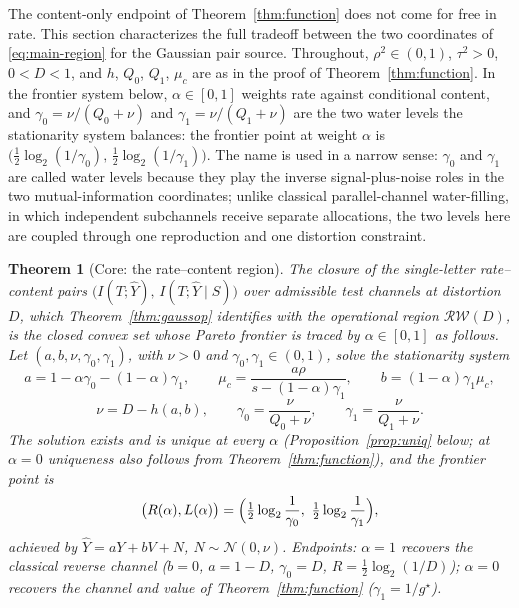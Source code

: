 ﻿\documentclass[11pt,onecolumn]{IEEEtran}
\newtheorem{theorem}{Theorem}
\newcommand{\hY}{\widehat{Y}}
\newcommand{\RW}{\mathcal{R}\!\mathcal{W}}
\begin{document}
The content-only endpoint of Theorem~\ref{thm:function} does not come for
free in rate. This section characterizes the full tradeoff between the
two coordinates of \eqref{eq:main-region} for the Gaussian pair source.
Throughout, $\rho^2\in(0,1)$, $\tau^2>0$, $0<D<1$, and $h$, $Q_0$,
$Q_1$, $\mu_c$ are as in the proof of Theorem~\ref{thm:function}. In
the frontier system below, $\alpha\in[0,1]$ weights rate against
conditional content, and $\gamma_0=\nu/(Q_0+\nu)$ and $\gamma_1=\nu/(Q_1+\nu)$
are the two water levels the stationarity system balances: the
frontier point at weight $\alpha$ is
$\bigl(\tfrac12\log_2(1/\gamma_0),\,\tfrac12\log_2(1/\gamma_1)\bigr)$.
The name is used in a narrow sense: $\gamma_0$ and $\gamma_1$ are
called water levels because they play the inverse
signal-plus-noise roles in the two mutual-information coordinates;
unlike classical parallel-channel water-filling, in which independent
subchannels receive separate allocations, the two levels here are
coupled through one reproduction and one distortion constraint.

\begin{theorem}[Core: the rate--content region]\label{thm:region}
The closure of the single-letter rate--content pairs
$\bigl(I(T;\hY),\,I(T;\hY\mid S)\bigr)$ over admissible test channels
at distortion $D$, which Theorem~\ref{thm:gaussop} identifies with the
operational region $\RW(D)$, is
the closed convex set whose Pareto frontier is traced by
$\alpha\in[0,1]$ as follows. Let
$(a,b,\nu,\gamma_0,\gamma_1)$, with $\nu>0$ and
$\gamma_0,\gamma_1\in(0,1)$, solve the stationarity system
\begin{equation}
a=1-\alpha\gamma_0-(1-\alpha)\gamma_1,
\qquad
\mu_c=\frac{a\rho}{s-(1-\alpha)\gamma_1},
\qquad
b=(1-\alpha)\gamma_1\mu_c,
\label{eq:twolevel-1}
\end{equation}
\begin{equation}
\nu=D-h(a,b),
\qquad
\gamma_0=\frac{\nu}{Q_0+\nu},
\qquad
\gamma_1=\frac{\nu}{Q_1+\nu}.
\label{eq:twolevel-2}
\end{equation}
The solution exists and is unique at every $\alpha$
(Proposition~\ref{prop:uniq} below; at $\alpha=0$ uniqueness also follows
from Theorem~\ref{thm:function}), and the frontier point is
\[
\bigl(R(\alpha),L(\alpha)\bigr)
=\Bigl(\tfrac12\log_2\frac1{\gamma_0},\
\tfrac12\log_2\frac1{\gamma_1}\Bigr),
\]
achieved by $\hY=aY+bV+N$, $N\sim\mathcal N(0,\nu)$. Endpoints:
$\alpha=1$ recovers the classical reverse channel ($b=0$, $a=1-D$,
$\gamma_0=D$, $R=\tfrac12\log_2(1/D)$); $\alpha=0$ recovers the channel
and value of Theorem~\ref{thm:function} ($\gamma_1=1/g^\star$).
\end{theorem}
\end{document}
